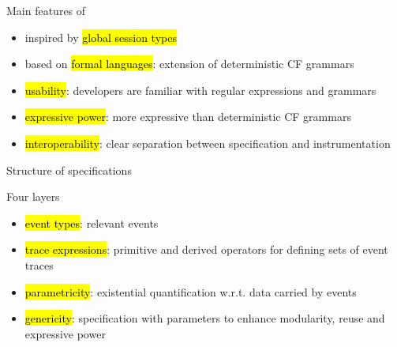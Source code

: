 \documentclass[10pt,usenames,dvipsnames]{beamer}
\begin{document}

\begin{frame}{\rml}

  \begin{block}{Main features of \rml}
    \begin{itemize}
    \item inspired by \hl{global session types}
    \item based on \hl{formal languages}: extension of deterministic CF grammars 
    \item \hl{usability}: developers are familiar with regular expressions and grammars
    \item \hl{expressive power}: more expressive than deterministic CF grammars
    \item \hl{interoperability}: clear separation between specification and instrumentation
    \end{itemize}
  \end{block}
\end{frame}


\begin{frame}{Structure of \rml specifications}
  \begin{block}{Four layers}
    \begin{itemize}
    \item \hl{event types}: relevant events 
    \item \hl{trace expressions}: primitive and derived operators for defining sets of event traces
    \item \hl{parametricity}: existential quantification w.r.t. data carried by events
    \item \hl{genericity}: specification with parameters to enhance modularity, reuse and expressive power
    \end{itemize}
  \end{block}
\end{frame}

\end{document}
